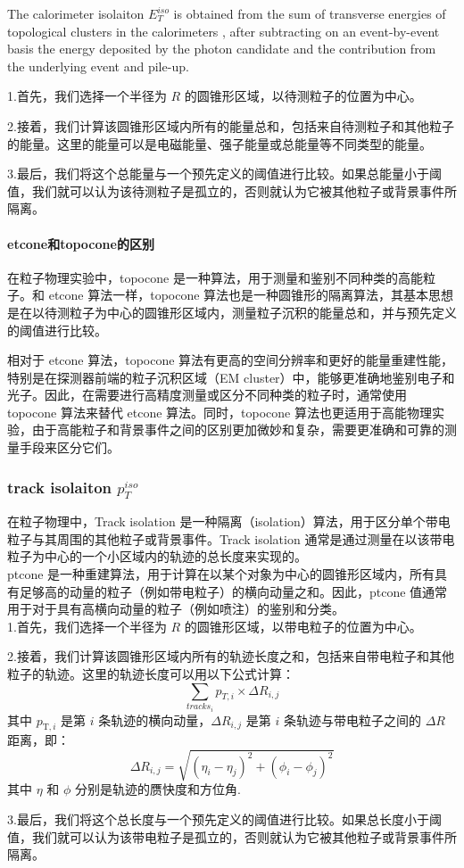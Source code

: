 \documentclass{ctexart}
\begin{document}
The calorimeter isolaiton $E_T^{iso}$ is obtained from the sum of transverse energies of topological clusters in the calorimeters , after subtracting on an event-by-event basis the energy deposited by the photon candidate and the contribution from the underlying event and pile-up.

1.首先，我们选择一个半径为 $R$ 的圆锥形区域，以待测粒子的位置为中心。\par
2.接着，我们计算该圆锥形区域内所有的能量总和，包括来自待测粒子和其他粒子的能量。这里的能量可以是电磁能量、强子能量或总能量等不同类型的能量。\par
3.最后，我们将这个总能量与一个预先定义的阈值进行比较。如果总能量小于阈值，我们就可以认为该待测粒子是孤立的，否则就认为它被其他粒子或背景事件所隔离。\par

\paragraph{etcone和topocone的区别}
在粒子物理实验中，topocone 是一种算法，用于测量和鉴别不同种类的高能粒子。和 etcone 算法一样，topocone 算法也是一种圆锥形的隔离算法，其基本思想是在以待测粒子为中心的圆锥形区域内，测量粒子沉积的能量总和，并与预先定义的阈值进行比较。

相对于 etcone 算法，topocone 算法有更高的空间分辨率和更好的能量重建性能，特别是在探测器前端的粒子沉积区域（EM cluster）中，能够更准确地鉴别电子和光子。因此，在需要进行高精度测量或区分不同种类的粒子时，通常使用 topocone 算法来替代 etcone 算法。同时，topocone 算法也更适用于高能物理实验，由于高能粒子和背景事件之间的区别更加微妙和复杂，需要更准确和可靠的测量手段来区分它们。
\subsubsection{track isolaiton $p_T^{iso}$}
在粒子物理中，Track isolation 是一种隔离（isolation）算法，用于区分单个带电粒子与其周围的其他粒子或背景事件。Track isolation 通常是通过测量在以该带电粒子为中心的一个小区域内的轨迹的总长度来实现的。\\

ptcone 是一种重建算法，用于计算在以某个对象为中心的圆锥形区域内，所有具有足够高的动量的粒子（例如带电粒子）的横向动量之和。因此，ptcone 值通常用于对于具有高横向动量的粒子（例如喷注）的鉴别和分类。\\

1.首先，我们选择一个半径为 $R$ 的圆锥形区域，以带电粒子的位置为中心。\par
2.接着，我们计算该圆锥形区域内所有的轨迹长度之和，包括来自带电粒子和其他粒子的轨迹。这里的轨迹长度可以用以下公式计算：
$$\sum_{tracks_i}p_{T,i}\times\Delta R_{i,j}$$
其中 $p_{\text{T},i}$ 是第 $i$ 条轨迹的横向动量，$\Delta R_{i,j}$ 是第 $i$ 条轨迹与带电粒子之间的 $\Delta R$ 距离，即：
$$\Delta R_{i,j}=\sqrt{(\eta_i-\eta_j)^2+(\phi_i-\phi_j)^2}$$
其中 $\eta$ 和 $\phi$ 分别是轨迹的赝快度和方位角.\par
3.最后，我们将这个总长度与一个预先定义的阈值进行比较。如果总长度小于阈值，我们就可以认为该带电粒子是孤立的，否则就认为它被其他粒子或背景事件所隔离。
\end{document}
